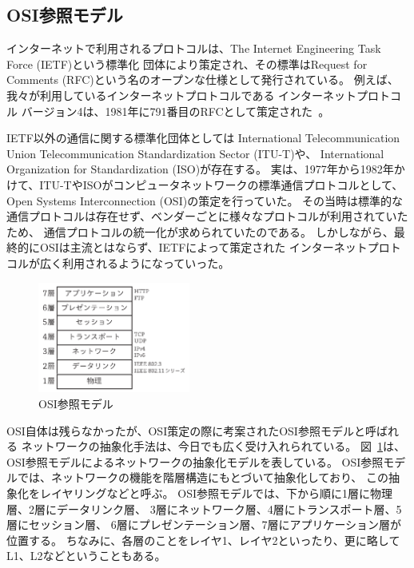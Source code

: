 \subsection{OSI参照モデル}

インターネットで利用されるプロトコルは、The Internet Engineering Task Force (IETF)という標準化
団体により策定され、その標準はRequest for Comments (RFC)という名のオープンな仕様として発行されている。
例えば、我々が利用しているインターネットプロトコルである
インターネットプロトコル バージョン4は、1981年に791番目のRFCとして策定された~\cite{RFC0791}。

IETF以外の通信に関する標準化団体としては
International Telecommunication Union Telecommunication Standardization Sector (ITU-T)や、
International Organization for Standardization (ISO)が存在する。
実は、1977年から1982年かけて、ITU-TやISOがコンピュータネットワークの標準通信プロトコルとして、
Open Systems Interconnection (OSI)の策定を行っていた。
その当時は標準的な通信プロトコルは存在せず、ベンダーごとに様々なプロトコルが利用されていたため、
通信プロトコルの統一化が求められていたのである。
しかしながら、最終的にOSIは主流とはならず、IETFによって策定された
インターネットプロトコルが広く利用されるようになっていった。

\begin{figure}[tb]
    \centering
    \includegraphics[width=5cm,pagebox=artbox]{figs/OSI.pdf}
    \caption{OSI参照モデル}
    \label{fig:osi}
\end{figure}

OSI自体は残らなかったが、OSI策定の際に考案されたOSI参照モデルと呼ばれる
ネットワークの抽象化手法は、今日でも広く受け入れられている。
図~\ref{fig:osi}は、OSI参照モデルによるネットワークの抽象化モデルを表している。
OSI参照モデルでは、ネットワークの機能を階層構造にもとづいて抽象化しており、
この抽象化をレイヤリングなどと呼ぶ。
OSI参照モデルでは、下から順に1層に物理層、2層にデータリンク層、
3層にネットワーク層、4層にトランスポート層、5層にセッション層、
6層にプレゼンテーション層、7層にアプリケーション層が位置する。
ちなみに、各層のことをレイヤ1、レイヤ2といったり、更に略してL1、L2などということもある。

